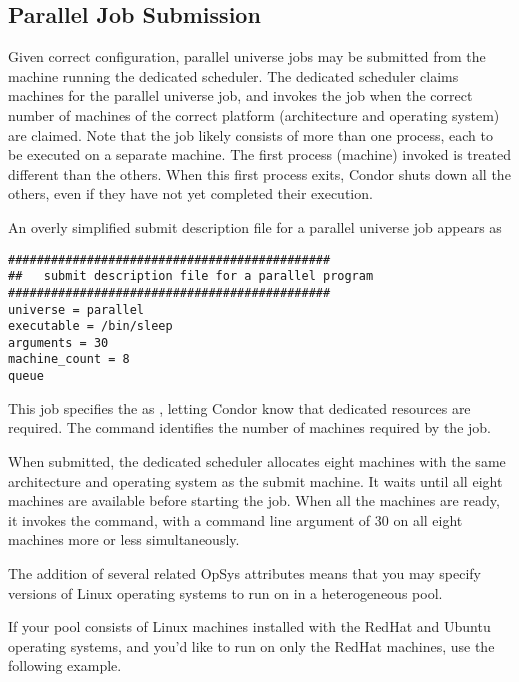 \subsection{\label{sec:parallel-submit}Parallel Job Submission}

Given correct configuration, parallel universe jobs may be submitted
from the machine running the dedicated scheduler.
The dedicated scheduler claims machines for the parallel universe job,
and invokes the job when the correct number of machines of the
correct platform (architecture and operating system) are claimed.
Note that the job likely consists of more than one process,
each to be executed on a separate machine.
The first process (machine) invoked is treated
different than the others.
When this first process exits, Condor shuts down all the others,
even if they have not yet completed their execution.

An overly simplified submit description file for a parallel universe
job appears as

\begin{verbatim}
#############################################
##   submit description file for a parallel program
#############################################
universe = parallel
executable = /bin/sleep
arguments = 30
machine_count = 8
queue 
\end{verbatim}

This job specifies the  as , letting
Condor know that dedicated resources are required.  The
 command identifies the number of machines
required by the job. 

When submitted, the dedicated scheduler allocates eight
machines with the same architecture and operating system as the submit
machine.  It waits until all eight machines are available before
starting the job.  When all the machines are ready, it invokes the
 command, with a command line argument of 30
on all eight machines more or less simultaneously.

The addition of several related OpSys attributes means that you may specify versions of Linux operating systems to run on in a heterogeneous pool.

If your pool consists of Linux machines installed with the RedHat and Ubuntu operating systems, and you'd like to run on only the RedHat machines, use the following example.

